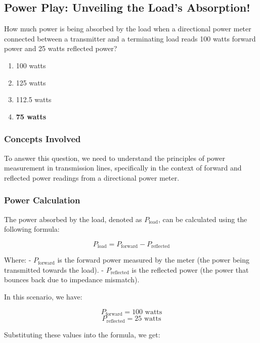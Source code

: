 \subsection{Power Play: Unveiling the Load's Absorption!}

\begin{tcolorbox}[colback=gray!10, colframe=black, title=E4B06]
How much power is being absorbed by the load when a directional power meter connected between a transmitter and a terminating load reads 100 watts forward power and 25 watts reflected power?

\begin{enumerate}[label=\Alph*.]
    \item 100 watts
    \item 125 watts
    \item 112.5 watts
    \item \textbf{75 watts}
\end{enumerate} \end{tcolorbox}

\subsubsection{Concepts Involved}

To answer this question, we need to understand the principles of power measurement in transmission lines, specifically in the context of forward and reflected power readings from a directional power meter.

\subsubsection{Power Calculation}

The power absorbed by the load, denoted as \( P_{\text{load}} \), can be calculated using the following formula:

\[
P_{\text{load}} = P_{\text{forward}} - P_{\text{reflected}}
\]

Where:
- \( P_{\text{forward}} \) is the forward power measured by the meter (the power being transmitted towards the load).
- \( P_{\text{reflected}} \) is the reflected power (the power that bounces back due to impedance mismatch).

In this scenario, we have:

\[
P_{\text{forward}} = 100 \text{ watts}
\]
\[
P_{\text{reflected}} = 25 \text{ watts}
\]

Substituting these values into the formula, we get:

